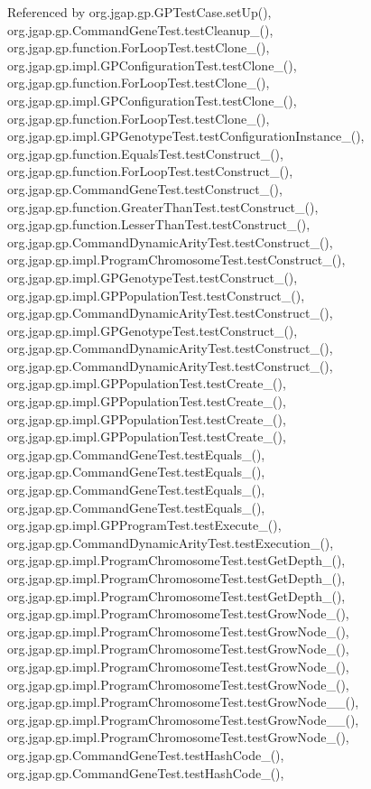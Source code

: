 Referenced by org.\-jgap.\-gp.\-G\-P\-Test\-Case.\-set\-Up(), org.\-jgap.\-gp.\-Command\-Gene\-Test.\-test\-Cleanup\-\_(), org.\-jgap.\-gp.\-function.\-For\-Loop\-Test.\-test\-Clone\-\_(), org.\-jgap.\-gp.\-impl.\-G\-P\-Configuration\-Test.\-test\-Clone\-\_(), org.\-jgap.\-gp.\-function.\-For\-Loop\-Test.\-test\-Clone\-\_(), org.\-jgap.\-gp.\-impl.\-G\-P\-Configuration\-Test.\-test\-Clone\-\_(), org.\-jgap.\-gp.\-function.\-For\-Loop\-Test.\-test\-Clone\-\_(), org.\-jgap.\-gp.\-impl.\-G\-P\-Genotype\-Test.\-test\-Configuration\-Instance\-\_(), org.\-jgap.\-gp.\-function.\-Equals\-Test.\-test\-Construct\-\_(), org.\-jgap.\-gp.\-function.\-For\-Loop\-Test.\-test\-Construct\-\_(), org.\-jgap.\-gp.\-Command\-Gene\-Test.\-test\-Construct\-\_(), org.\-jgap.\-gp.\-function.\-Greater\-Than\-Test.\-test\-Construct\-\_(), org.\-jgap.\-gp.\-function.\-Lesser\-Than\-Test.\-test\-Construct\-\_(), org.\-jgap.\-gp.\-Command\-Dynamic\-Arity\-Test.\-test\-Construct\-\_(), org.\-jgap.\-gp.\-impl.\-Program\-Chromosome\-Test.\-test\-Construct\-\_(), org.\-jgap.\-gp.\-impl.\-G\-P\-Genotype\-Test.\-test\-Construct\-\_(), org.\-jgap.\-gp.\-impl.\-G\-P\-Population\-Test.\-test\-Construct\-\_(), org.\-jgap.\-gp.\-Command\-Dynamic\-Arity\-Test.\-test\-Construct\-\_(), org.\-jgap.\-gp.\-impl.\-G\-P\-Genotype\-Test.\-test\-Construct\-\_(), org.\-jgap.\-gp.\-Command\-Dynamic\-Arity\-Test.\-test\-Construct\-\_(), org.\-jgap.\-gp.\-Command\-Dynamic\-Arity\-Test.\-test\-Construct\-\_(), org.\-jgap.\-gp.\-impl.\-G\-P\-Population\-Test.\-test\-Create\-\_(), org.\-jgap.\-gp.\-impl.\-G\-P\-Population\-Test.\-test\-Create\-\_(), org.\-jgap.\-gp.\-impl.\-G\-P\-Population\-Test.\-test\-Create\-\_(), org.\-jgap.\-gp.\-impl.\-G\-P\-Population\-Test.\-test\-Create\-\_(), org.\-jgap.\-gp.\-Command\-Gene\-Test.\-test\-Equals\-\_(), org.\-jgap.\-gp.\-Command\-Gene\-Test.\-test\-Equals\-\_(), org.\-jgap.\-gp.\-Command\-Gene\-Test.\-test\-Equals\-\_(), org.\-jgap.\-gp.\-Command\-Gene\-Test.\-test\-Equals\-\_(), org.\-jgap.\-gp.\-impl.\-G\-P\-Program\-Test.\-test\-Execute\-\_(), org.\-jgap.\-gp.\-Command\-Dynamic\-Arity\-Test.\-test\-Execution\-\_(), org.\-jgap.\-gp.\-impl.\-Program\-Chromosome\-Test.\-test\-Get\-Depth\-\_(), org.\-jgap.\-gp.\-impl.\-Program\-Chromosome\-Test.\-test\-Get\-Depth\-\_(), org.\-jgap.\-gp.\-impl.\-Program\-Chromosome\-Test.\-test\-Get\-Depth\-\_(), org.\-jgap.\-gp.\-impl.\-Program\-Chromosome\-Test.\-test\-Grow\-Node\-\_(), org.\-jgap.\-gp.\-impl.\-Program\-Chromosome\-Test.\-test\-Grow\-Node\-\_(), org.\-jgap.\-gp.\-impl.\-Program\-Chromosome\-Test.\-test\-Grow\-Node\-\_(), org.\-jgap.\-gp.\-impl.\-Program\-Chromosome\-Test.\-test\-Grow\-Node\-\_(), org.\-jgap.\-gp.\-impl.\-Program\-Chromosome\-Test.\-test\-Grow\-Node\-\_(), org.\-jgap.\-gp.\-impl.\-Program\-Chromosome\-Test.\-test\-Grow\-Node\-\_\-\_(), org.\-jgap.\-gp.\-impl.\-Program\-Chromosome\-Test.\-test\-Grow\-Node\-\_\-\_(), org.\-jgap.\-gp.\-impl.\-Program\-Chromosome\-Test.\-test\-Grow\-Node\-\_(), org.\-jgap.\-gp.\-Command\-Gene\-Test.\-test\-Hash\-Code\-\_(), org.\-jgap.\-gp.\-Command\-Gene\-Test.\-test\-Hash\-Code\-\_(), 